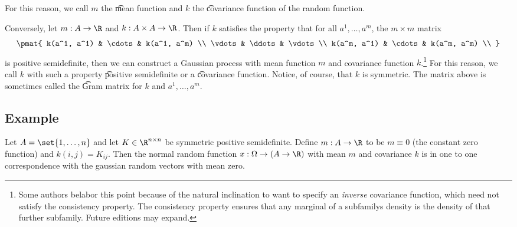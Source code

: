 For this reason, we call $m$ the \t{mean function} and $k$ the \t{covariance function} of the random function.

Conversely, let $m: A \to \R $ and $k: A \times A \to \R $.
Then if $k$ satisfies the property that for all $a^1, \dots , a^m$, the $m \times m$ matrix
\[
\pmat{
k(a^1, a^1) & \cdots & k(a^1, a^m) \\
\vdots & \ddots & \vdots \\
k(a^m, a^1) & \cdots & k(a^m, a^m) \\
}
\]
is positive semidefinite, then we can construct a Gaussian process with mean function $m$ and covariance function $k$.\footnote{Some authors belabor this point because of the natural inclination to want to specify an \textit{inverse} covariance function, which need not satisfy the consistency property. The consistency property ensures that any marginal of a subfamilys density is the density of that further subfamily. Future editions may expand.}
For this reason, we call $k$ with such a property \t{positive semidefinite} or a \t{covariance function}.
Notice, of course, that $k$ is symmetric.
The matrix above is sometimes called the \t{Gram matrix} for $k$ and $a^1, \dots , a^m$.

  \subsection*{Example}

Let $A = \set{1, \dots , n}$ and let $K \in \R ^{n \times n}$ be symmetric positive semidefinite.
Define $m: A \to \R $ to be $m \equiv 0$ (the constant zero function) and $k(i, j) = K_{ij}$.
Then the normal random function $x: \Omega  \to (A \to \R )$ with mean $m$ and covariance $k$ is in one to one correspondence with the gaussian random vectors with mean zero.


